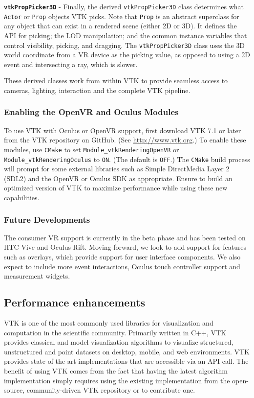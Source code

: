 \textbf{\texttt{vtkPropPicker3D}} - Finally, the derived \texttt{vtkPropPicker3D} class determines what \texttt{Actor} or \texttt{Prop} objects VTK picks.
Note that \texttt{Prop} is an abstract superclass for any object that can exist in a rendered scene (either 2D or 3D). It defines the API for picking; the LOD manipulation; and the common instance variables that control visibility, picking, and dragging.
The \texttt{vtkPropPicker3D} class uses the 3D world coordinate from a VR device as the picking value, as opposed to using a 2D event and intersecting a ray, which is slower.

These derived classes work from within VTK to provide seamless access to cameras, lighting, interaction and the complete VTK pipeline.

\subsubsection{Enabling the OpenVR and Oculus Modules}

To use VTK with Oculus or OpenVR support, first download VTK 7.1 or later from the VTK
repository on GitHub. (See \url{http://www.vtk.org}.)
To enable these modules, use \texttt{CMake} to set \texttt{Module\_vtkRenderingOpenVR} or \texttt{Module\_vtkRenderingOculus} to \texttt{ON}. (The default is \texttt{OFF}.)
The \texttt{CMake} build process will prompt for some external libraries such as Simple DirectMedia Layer 2 (SDL2) and the OpenVR or Oculus SDK as appropriate.
Ensure to build an optimized version of VTK to maximize performance while using these new capabilities.

\subsubsection{Future Developments}

The consumer VR support is currently in the beta phase and has been tested on HTC Vive and Oculus Rift. Moving forward, we look to add support for features such as overlays, which provide support for user interface components. We also expect to include more event interactions, Oculus touch controller support and measurement widgets.

\subsection{Performance enhancements}

VTK is one of the most commonly used libraries for visualization and computation in the scientific community.
Primarily written in C++, VTK provides classical and model visualization algorithms to visualize structured, unstructured and point datasets on desktop, mobile, and web environments.
VTK provides state-of-the-art implementations that are accessible via an API call.
The benefit of using VTK comes from the fact that having the latest algorithm implementation simply requires using the existing implementation from the
open-source, community-driven VTK repository or to contribute one.

